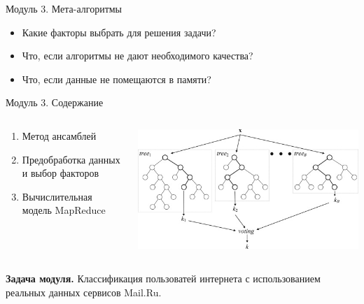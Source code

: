 \documentclass[10pt,a4paper]{beamer}
\begin{document}

\begin{frame}{Модуль 3. Мета-алгоритмы}

\begin{itemize}
\item Какие факторы выбрать для решения задачи?
\item Что, если  алгоритмы не дают необходимого качества?
\item Что, если данные не помещаются в памяти?
\end{itemize}

\end{frame}


\begin{frame}{Модуль 3. Содержание}

\begin{columns}[T]
    \begin{column}{.4\textwidth}
     \begin{block}{}
     	\begin{footnotesize}
     		\begin{enumerate}
     		\item Метод ансамблей
			\item Предобработка данных и выбор факторов
			\item Вычислительная модель MapReduce
     		\end{enumerate}     				
     	\end{footnotesize}
    \end{block}
    \end{column}
    \begin{column}{.55\textwidth}
    \begin{block}{}
    \vspace{-3em}
	\begin{center}
   		\includegraphics[scale=0.5]{images/rf.jpg}
    \end{center}
    \end{block}
    \end{column}
\end{columns}

  {\bf Задача модуля.} Классификация пользоватей интернета с использованием реальных данных сервисов Mail.Ru.

\end{frame}
\end{document}
